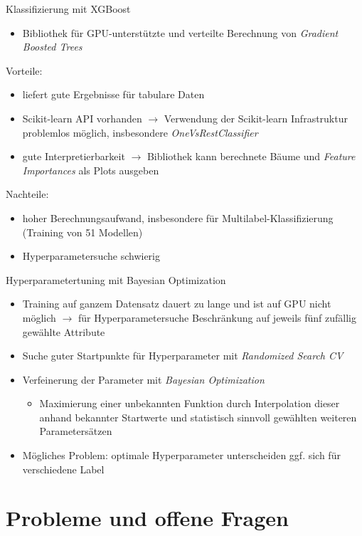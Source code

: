 \documentclass[10pt,%
	wide,%
	xcolor={x11names},%
	hyperref={colorlinks},%
	pantone312,%
	handout,%
	]{beamer}
\begin{document}
\begin{frame}[t]{Klassifizierung mit XGBoost}
	\begin{itemize}
		\item Bibliothek für GPU-unterstützte und verteilte Berechnung von \emph{Gradient Boosted Trees}
	\end{itemize}
	Vorteile:
	\begin{itemize}
		\item liefert gute Ergebnisse für tabulare Daten
		\item Scikit-learn API vorhanden $\rightarrow$ Verwendung der Scikit-learn Infrastruktur problemlos möglich, insbesondere \emph{OneVsRestClassifier}
		\item gute Interpretierbarkeit $\rightarrow$ Bibliothek kann berechnete Bäume und \emph{Feature Importances} als Plots ausgeben
	\end{itemize}
	Nachteile:
	\begin{itemize}
		\item hoher Berechnungsaufwand, insbesondere für Multilabel-Klassifizierung (Training von 51 Modellen)
		\item Hyperparametersuche schwierig
	\end{itemize}
\end{frame}

\begin{frame}[t]{Hyperparametertuning mit Bayesian Optimization}
	\begin{itemize}
		\item Training auf ganzem Datensatz dauert zu lange und ist auf GPU nicht möglich $\rightarrow$ für Hyperparametersuche Beschränkung auf jeweils fünf zufällig gewählte Attribute
		\item Suche guter Startpunkte für Hyperparameter mit \emph{Randomized Search CV}
		\item Verfeinerung der Parameter mit \emph{Bayesian Optimization}
		\begin{itemize}
			\item Maximierung einer unbekannten Funktion durch Interpolation dieser anhand bekannter Startwerte und statistisch sinnvoll gewählten weiteren Parametersätzen
		\end{itemize}
		\item Mögliches Problem: optimale Hyperparameter unterscheiden ggf. sich für verschiedene Label
	\end{itemize}
\end{frame}

\section{Probleme und offene Fragen}
\end{document}
